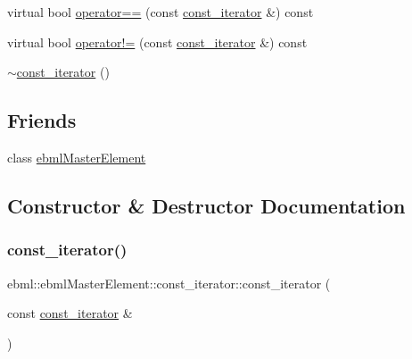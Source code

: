 \begin{DoxyCompactItemize}
\item 
virtual bool \mbox{\hyperlink{classebml_1_1ebmlMasterElement_1_1const__iterator_a86b9dc0a7b3c5537c6082eea9cca4541}{operator==}} (const \mbox{\hyperlink{classebml_1_1ebmlMasterElement_1_1const__iterator}{const\+\_\+iterator}} \&) const
\item 
virtual bool \mbox{\hyperlink{classebml_1_1ebmlMasterElement_1_1const__iterator_ac3dee59949c1b54bc07cb7189d79e893}{operator!=}} (const \mbox{\hyperlink{classebml_1_1ebmlMasterElement_1_1const__iterator}{const\+\_\+iterator}} \&) const
\item 
\mbox{\hyperlink{classebml_1_1ebmlMasterElement_1_1const__iterator_ae08d234aba7d4903d7245c88dc1398fd}{$\sim$const\+\_\+iterator}} ()
\end{DoxyCompactItemize}
\subsection*{Friends}
\begin{DoxyCompactItemize}
\item 
class \mbox{\hyperlink{classebml_1_1ebmlMasterElement_1_1const__iterator_ad88e86cba72e9332a4693c1c6009b281}{ebml\+Master\+Element}}
\end{DoxyCompactItemize}


\subsection{Constructor \& Destructor Documentation}
\mbox{\label{classebml_1_1ebmlMasterElement_1_1const__iterator_ac594446dbd101995ebaedafab5c046d9}} 
\subsubsection{\texorpdfstring{const\+\_\+iterator()}{const\_iterator()}\hspace{0.1cm}{\footnotesize\ttfamily [1/2]}}
{\footnotesize\ttfamily ebml\+::ebml\+Master\+Element\+::const\+\_\+iterator\+::const\+\_\+iterator (\begin{DoxyParamCaption}\item[{const \mbox{\hyperlink{classebml_1_1ebmlMasterElement_1_1const__iterator}{const\+\_\+iterator}} \&}]{ }\end{DoxyParamCaption})}

